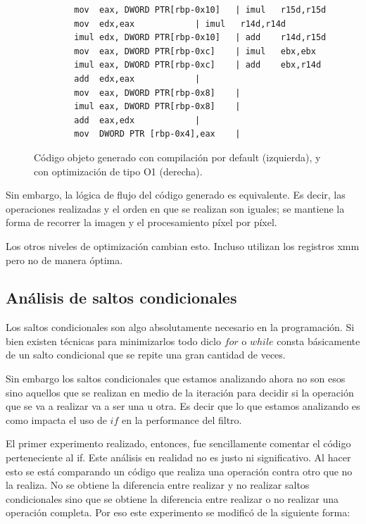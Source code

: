 \begin{figure}[h]
	\begin{mdframed}
	\begin{center}
		\begin{lstlisting}
		mov  eax, DWORD PTR[rbp-0x10]	| imul   r15d,r15d
		mov  edx,eax			| imul   r14d,r14d
		imul edx, DWORD PTR[rbp-0x10]	| add    r14d,r15d
		mov  eax, DWORD PTR[rbp-0xc]	| imul   ebx,ebx
		imul eax, DWORD PTR[rbp-0xc]	| add    ebx,r14d
		add  edx,eax			|			
		mov  eax, DWORD PTR[rbp-0x8]	|			
		imul eax, DWORD PTR[rbp-0x8]	|			
		add  eax,edx			|			
		mov  DWORD PTR [rbp-0x4],eax	|			
		\end{lstlisting}
	\end{center}
	\end{mdframed}
	\caption{Código objeto generado con compilación por default (izquierda), y con optimización de tipo O1 (derecha).}
	\label{fig:codigo-objeto-filtro-color}
\end{figure}

Sin embargo, la lógica de flujo del código generado es equivalente. Es decir, las operaciones realizadas y el orden en que se realizan son iguales; se mantiene la forma de recorrer la imagen y el procesamiento píxel por píxel.

	Los otros niveles de optimización cambian esto. Incluso utilizan los registros xmm
pero no de manera óptima.


\subsection{Análisis de saltos condicionales}

	Los saltos condicionales son algo absolutamente necesario en la programación.
Si bien existen técnicas para minimizarlos todo diclo $for$ o $while$ consta
básicamente de un salto condicional que se repite una gran cantidad de veces.

	Sin embargo los saltos condicionales que estamos analizando ahora no son
esos sino aquellos que se realizan en medio de la iteración para decidir
si la operación que se va a realizar va a ser una u otra. Es decir que lo
que estamos analizando es como impacta el uso de $if$ en la performance
del filtro.

	
	El primer experimento realizado, entonces, fue sencillamente comentar
el código perteneciente al if. Este análisis en realidad no es justo
ni significativo. Al hacer esto se está comparando un código
que realiza una operación contra otro que no la realiza.
No se obtiene la diferencia entre realizar y no realizar saltos
condicionales sino que se obtiene la diferencia entre realizar
o no realizar una operación completa. Por eso este experimento
se modificó de la siguiente forma:

